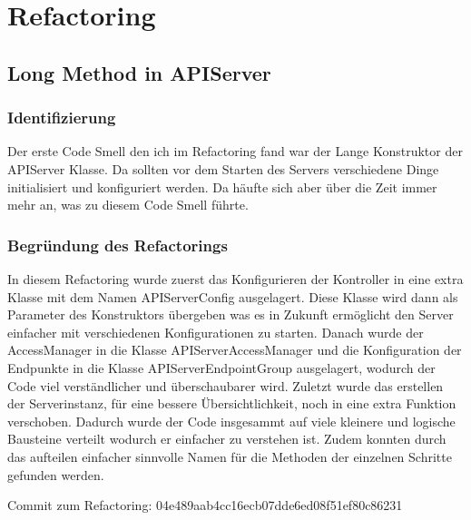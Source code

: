 \chapter{Refactoring}

\section{Long Method in APIServer}

\subsection{Identifizierung}

Der erste Code Smell den ich im Refactoring fand war der Lange Konstruktor der APIServer Klasse.
Da sollten vor dem Starten des Servers verschiedene Dinge initialisiert und konfiguriert werden.
Da häufte sich aber über die Zeit immer mehr an, was zu diesem Code Smell führte.

\subsection{Begründung des Refactorings}

In diesem Refactoring wurde zuerst das Konfigurieren der Kontroller in eine extra Klasse mit dem Namen APIServerConfig ausgelagert.
Diese Klasse wird dann als Parameter des Konstruktors übergeben was es in Zukunft ermöglicht den Server einfacher mit verschiedenen Konfigurationen zu starten.
Danach wurde der AccessManager in die Klasse APIServerAccessManager und die Konfiguration der Endpunkte in die Klasse APIServerEndpointGroup ausgelagert,
wodurch der Code viel verständlicher und überschaubarer wird.
Zuletzt wurde das erstellen der Serverinstanz, für eine bessere Übersichtlichkeit, noch in eine extra Funktion verschoben.
Dadurch wurde der Code insgesammt auf viele kleinere und logische Bausteine verteilt wodurch er einfacher zu verstehen ist.
Zudem konnten durch das aufteilen einfacher sinnvolle Namen für die Methoden der einzelnen Schritte gefunden werden.

Commit zum Refactoring: 04e489aab4cc16ecb07dde6ed08f51ef80c86231

